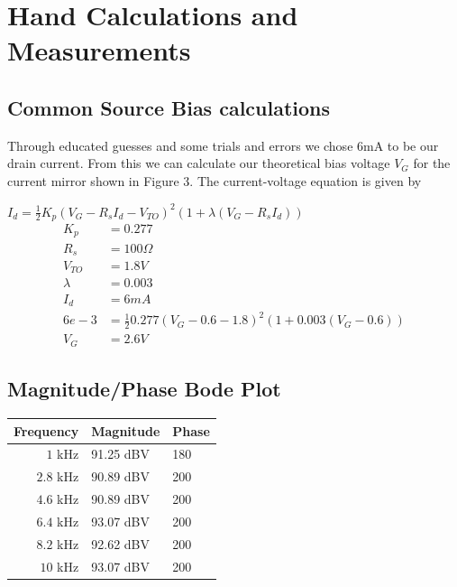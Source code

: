 \documentclass[11pt, twoside, letterpaper]{article}
\begin{document}
\section{Hand Calculations and Measurements}
\subsection{Common Source Bias calculations}
Through educated guesses and some trials and errors we chose 6mA to be our drain current. From this we can calculate our theoretical bias voltage
$V_G$ for the current mirror shown in Figure 3. The current-voltage equation is given by

$I_d = \frac{1}{2} K_p (V_G - R_s I_d -V_{TO})^2 (1 + \lambda (V_G - R_s I_d))$
\begin{align*}
K_p &= 0.277\\
R_s &= 100\Omega\\
V_{TO} &= 1.8V\\
\lambda &= 0.003\\
I_d &= 6mA\\
6e-3 &= \frac{1}{2}0.277(V_G-0.6-1.8)^2(1+0.003(V_G-0.6))\\
V_G &= 2.6V
\end{align*}

\subsection*{Magnitude/Phase Bode Plot}

\begin{tabular}{|r|l|l|}
\hline
Frequency & Magnitude & Phase\\
\hline
$1$ kHz & 91.25 dBV & 180 \\
$2.8$ kHz & 90.89 dBV & 200 \\
$4.6$ kHz & 90.89 dBV & 200 \\
$6.4$ kHz& 93.07 dBV & 200 \\
$8.2$ kHz & 92.62 dBV & 200 \\
$10$  kHz& 93.07 dBV & 200 \\
\hline
\end{tabular}
\end{document}
